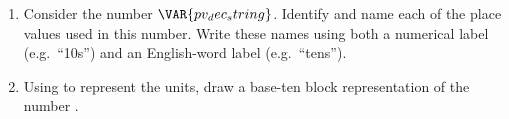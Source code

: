 

\begin{enumerate}
    \item Consider the number $\VAR{pv_dec_string}$. Identify and name each of the place values used in this number. Write these names using both a numerical label (e.g.\ ``10s'') and an English-word label (e.g.\ ``tens'').

    \vspace{20pt}
    \begin{ansenv}
    \end{ansenv}
    \vfill

    \item Using  to represent the units, draw a base-ten block representation of the number .

    \vspace{20pt}
    \begin{ansenv}
    \end{ansenv}
    \vfill
\end{enumerate}

\newpage


